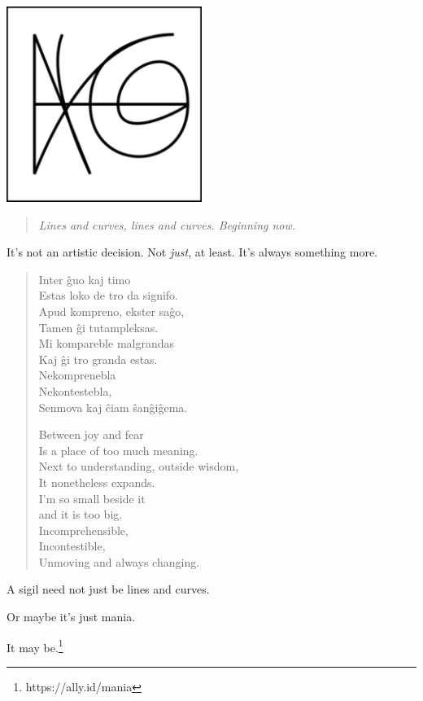 \begin{paracol}{2}
\begin{rightcolumn}
    \null
    \vfill
    \noindent\includegraphics[width=2.5in]{assets/3.png}

    \begin{quote}
    \emph{Lines and curves, lines and curves. Beginning now.}
    \end{quote}
\end{rightcolumn}
\begin{leftcolumn}
It's not an artistic decision. Not \emph{just}, at least. It's always something more.

\begin{verse}
Inter ĝuo kaj timo\\
Estas loko de tro da signifo.\\
Apud kompreno, ekster saĝo,\\
Tamen ĝi tutampleksas.\\
Mi kompareble malgrandas\\
Kaj ĝi tro granda estas.\\
Nekomprenebla\\
Nekontestebla,\\
Senmova kaj ĉiam ŝanĝiĝema.

Between joy and fear\\
Is a place of too much meaning.\\
Next to understanding, outside wisdom,\\
It nonetheless expands.\\
I'm so small beside it\\
and it is too big.\\
Incomprehensible,\\
Incontestible,\\
Unmoving and always changing.
\end{verse}

A sigil need not just be lines and curves.

\begin{ally}
Or maybe it's just mania.
\end{ally}
It may be.\footnote{https://ally.id/mania}
\newpage
\end{leftcolumn}
\end{paracol}
